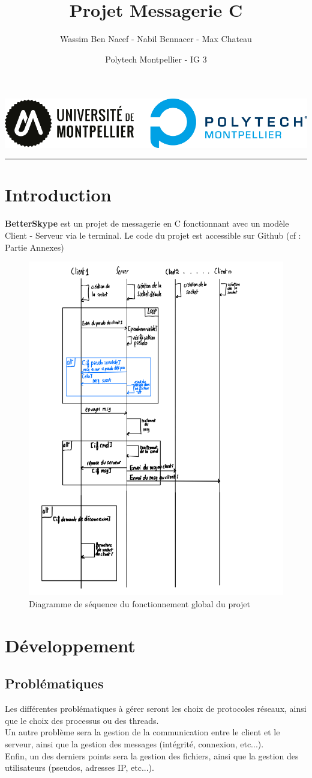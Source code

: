 \documentclass{cs-moi}
\title{Projet Messagerie C}
\author{Wassim Ben Nacef - Nabil Bennacer - Max Chateau}
\date{Polytech Montpellier - IG 3}
\begin{document}
\maketitle{}
\begin{center}
	\includegraphics[width=0.3\linewidth]{logoPolytech.png}
\end{center}

\vspace{4pt}
    \hrule
\vspace{4pt}
  
\section{Introduction}
\textbf{BetterSkype} est un projet de messagerie en C fonctionnant avec un modèle Client - Serveur via le terminal. Le code du projet est accessible sur Github (cf : Partie Annexes)

\begin{figure}[h!]
    \centering
    \includegraphics[width=0.5\linewidth]{seqGeneral.png}
    \caption{Diagramme de séquence du fonctionnement global du projet}
\end{figure}

\section{Développement}
\subsection{Problématiques}
Les différentes problématiques à gérer seront les choix de protocoles réseaux, ainsi que le choix des processus ou des threads.\\
Un autre problème sera la gestion de la communication entre le client et le serveur, ainsi que la gestion des messages (intégrité, connexion, etc...).\\
Enfin, un des derniers points sera la gestion des fichiers, ainsi que la gestion des utilisateurs (pseudos, adresses IP, etc...).
\end{document}
